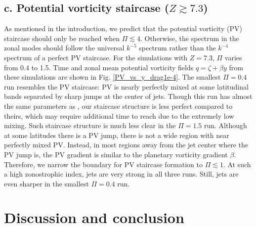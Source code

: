\documentclass{ametsoc}
\begin{document}
\subsection*{c. Potential vorticity staircase ($Z\apprge7.3$)}

As mentioned in the introduction, we predict that the potential vorticity
(PV) staircase should only be reached when $\Pi\apprle4$. Otherwise,
the spectrum in the zonal modes should follow the universal $k^{-5}$
spectrum rather than the $k^{-4}$ spectrum of a perfect PV staircase.
For the simulations with $Z=7.3$, $\Pi$ varies from 0.4 to 1.5.
Time and zonal mean potential vorticity fields $q=\zeta+\beta y$
from these simulations are shown in Fig. \ref{PV_vs_y_drag1e-4}.
The smallest $\Pi=0.4$ run resembles the PV staircase: PV is nearly
perfectly mixed at some latitudinal bands separated by sharp jumps
at the center of jets. Though this run has almost the same parameters as \citet{Scott2012},
our staircase structure is less perfect compared to theirs, which may
require additional time to reach due to the extremely low mixing.
Such staircase structure is much less clear in the $\Pi=1.5$ run.
Although at some latitudes there is a PV jump, there is not a wide
region with near perfectly mixed PV. Instead, in most regions away from
the jet center where the PV jump is, the PV gradient is similar to the
planetary vorticity gradient $\beta$. Therefore, we narrow the boundary
for PV staircase formation to $\Pi\apprle1$. At such a high zonostrophic
index, jets are very strong in all three runs. Still, jets
are even sharper in the smallest $\Pi=0.4$ run.


\section{Discussion and conclusion}
\end{document}
